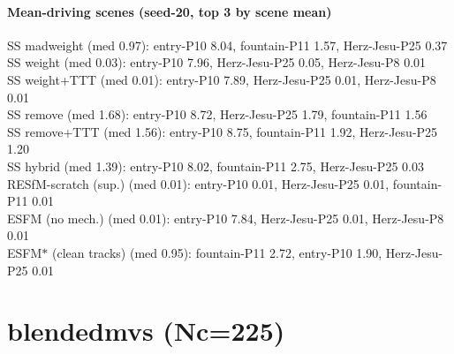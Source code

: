 \documentclass[10pt]{article}
\begin{document}
\paragraph{Mean-driving scenes (seed-20, top 3 by scene mean)}
\indent SS madweight (med 0.97): entry-P10 8.04, fountain-P11 1.57, Herz-Jesu-P25 0.37\\
\indent SS weight (med 0.03): entry-P10 7.96, Herz-Jesu-P25 0.05, Herz-Jesu-P8 0.01\\
\indent SS weight+TTT (med 0.01): entry-P10 7.89, Herz-Jesu-P25 0.01, Herz-Jesu-P8 0.01\\
\indent SS remove (med 1.68): entry-P10 8.72, Herz-Jesu-P25 1.79, fountain-P11 1.56\\
\indent SS remove+TTT (med 1.56): entry-P10 8.75, fountain-P11 1.92, Herz-Jesu-P25 1.20\\
\indent SS hybrid (med 1.39): entry-P10 8.02, fountain-P11 2.75, Herz-Jesu-P25 0.03\\
\indent RESfM-scratch (sup.) (med 0.01): entry-P10 0.01, Herz-Jesu-P25 0.01, fountain-P11 0.01\\
\indent ESFM (no mech.) (med 0.01): entry-P10 7.84, Herz-Jesu-P25 0.01, Herz-Jesu-P8 0.01\\
\indent ESFM$\ast$ (clean tracks) (med 0.95): fountain-P11 2.72, entry-P10 1.90, Herz-Jesu-P25 0.01\\
\section*{blendedmvs  (Nc=225)}
\begin{center}\end{center}
\end{document}
